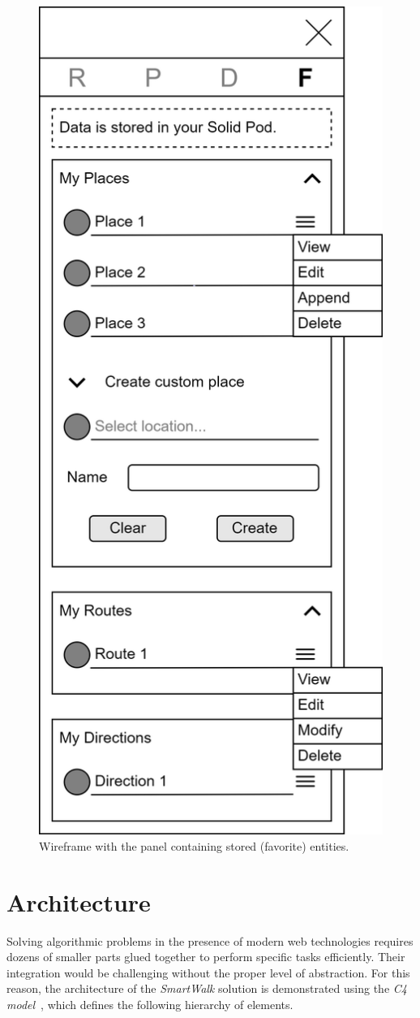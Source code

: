 \clearpage

\begin{figure}
\centering
\includegraphics[width=0.55\linewidth]{img/design/ui-favorites.png}
\caption{Wireframe with the panel containing stored (favorite) entities.}
\label{fig:ui-favorites}
\end{figure}

\clearpage

\section{Architecture}\label{sec:architecture}

Solving algorithmic problems in the presence of modern web technologies requires dozens of smaller parts glued together to perform specific tasks efficiently. Their integration would be challenging without the proper level of abstraction. For this reason, the architecture of the \emph{SmartWalk} solution is demonstrated using the \emph{C4 model}~\cite{brown18}, which defines the following hierarchy of elements.

